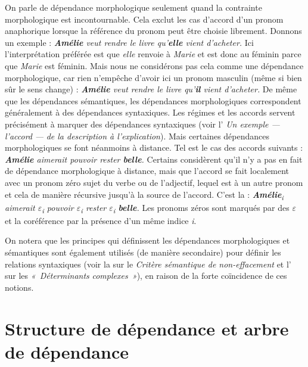 {    On parle de dépendance morphologique seulement quand la contrainte morphologique est incontournable. Cela exclut les cas d’accord d’un pronom anaphorique lorsque la référence du pronom peut être choisie librement. Donnons un exemple :
    \ea
        \textit{\textbf{{Amélie}}  {veut rendre le livre qu’}\textbf{{elle}}  {vient d’acheter.}}
    \z
    Ici l’interprétation préférée est que \textit{elle} renvoie à \textit{Marie} et est donc au féminin parce que \textit{Marie} est féminin. Mais nous ne considérons pas cela comme une dépendance morphologique, car rien n’empêche d’avoir ici un pronom masculin (même si bien sûr le sens change) :
    \ea
        \textit{\textbf{{Amélie}}  {veut rendre le livre qu’}\textbf{{il}}  {vient d’acheter.}}
    \z
    De même que les dépendances sémantiques, les dépendances morphologiques correspondent généralement à des dépendances syntaxiques. Les régimes et les accords servent précisément à marquer des dépendances syntaxiques (voir l' \textit{Un exemple —} \textit{l’accord} \textit{—} \textit{de la description à l’explication}). Mais certaines dépendances morphologiques se font néanmoins à distance. Tel est le cas des accords suivants :
    \ea
        \textit{\textbf{{Amélie}}  {aimerait pouvoir rester} \textbf{{belle}}.}
    \z
    Certains considèrent qu’il n’y a pas en fait de dépendance morphologique à distance, mais que l’accord se fait localement avec un pronom zéro sujet du verbe ou de l’adjectif, lequel est  à un autre pronom et cela de manière récursive jusqu’à la source de l’accord. C’est la  :
    \ea
       \textit{ \textbf{{Amélie}}{\textsubscript{i}}  {aimerait} \textrm{${\varepsilon}$}{\textsubscript{i}}  {pouvoir} \textrm{${\varepsilon}$}{\textsubscript{i}}  {rester} \textrm{${\varepsilon}$}{\textsubscript{i}} \textbf{{belle}}.}
    \z
    Les pronoms zéros sont marqués par des \textrm{${\varepsilon}$} et la coréférence par la présence d’un même indice \textit{i}.

    On notera que les principes qui définissent les dépendances morphologiques et sémantiques sont également utilisés (de manière secondaire) pour définir les relations syntaxiques (voir la  sur le \textit{Critère sémantique de non-effacement} et l’ sur les \textit{«~Déterminants} \textit{complexes~»}), en raison de la forte coïncidence de ces notions.
}
\section{Structure de dépendance et arbre de dépendance}\label{sec:3.3.4}


